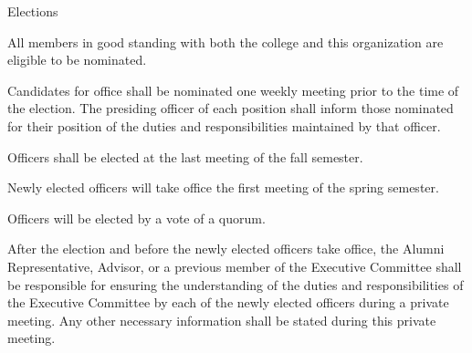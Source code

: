 {
	\begin{article}{Elections}
		\item All members in good standing with both the college and this organization are eligible to be nominated.
		\item Candidates for office shall be nominated one weekly meeting prior to the time of the election. The presiding officer of each position shall inform those nominated for their position of the duties and responsibilities maintained by that officer.
		\item Officers shall be elected at the last meeting of the fall semester.
		\item Newly elected officers will take office the first meeting of the spring semester.
		\item Officers will be elected by a vote of a quorum.
		\item After the election and before the newly elected officers take office, the Alumni Representative, Advisor, or a previous member of the Executive Committee shall be responsible for ensuring the understanding of the duties and responsibilities of the Executive Committee by each of the newly elected officers during a private meeting. Any other necessary information shall be stated during this private meeting.
	\end{article}
}